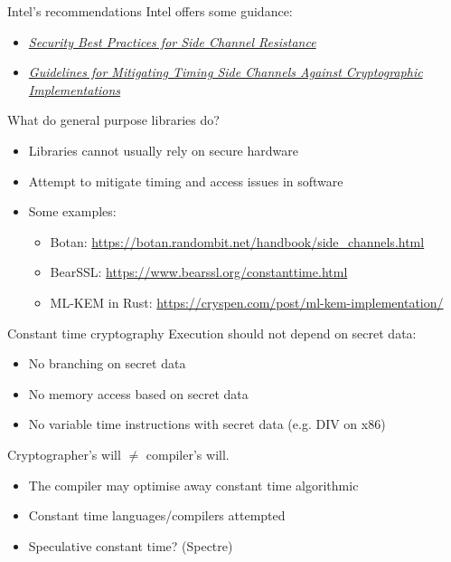 \begin{frame}{Intel's recommendations}
  Intel offers some guidance:
  \begin{itemize}
    \item \href{https://www.intel.com/content/www/us/en/developer/articles/technical/software-security-guidance/secure-coding/security-best-practices-side-channel-resistance.html}{\textit{Security Best Practices for Side Channel Resistance}}
    \item \href{https://www.intel.com/content/www/us/en/developer/articles/technical/software-security-guidance/secure-coding/mitigate-timing-side-channel-crypto-implementation.html}{\textit{Guidelines for Mitigating Timing Side Channels Against Cryptographic Implementations}}
  \end{itemize}
  
  \pause
  What do general purpose libraries do?
  \begin{itemize}[<+(1)->]
    \item Libraries cannot usually rely on secure hardware
    \item Attempt to mitigate timing and access issues in software
    \item Some examples:
    \begin{itemize}
    \item Botan: {\small\url{https://botan.randombit.net/handbook/side_channels.html}}
    \item BearSSL: {\small\url{https://www.bearssl.org/constanttime.html}}
    \item ML-KEM in Rust: {\small\url{https://cryspen.com/post/ml-kem-implementation/}}
    \end{itemize}
  \end{itemize}
\end{frame}

\begin{frame}{Constant time cryptography}
  \pause
  Execution should not depend on secret data:
  \begin{itemize}[<+(1)->]
    \item No branching on secret data
    \item No memory access based on secret data
    \item No variable time instructions with secret data (e.g. DIV on x86)
  \end{itemize}
  
  \pause
  Cryptographer's will $\neq$ compiler's will.
  \begin{itemize}[<+(1)->]
    \item The compiler may optimise away constant time algorithmic
    \item Constant time languages/compilers attempted
    \item Speculative constant time? (Spectre)
  \end{itemize}
\end{frame}

